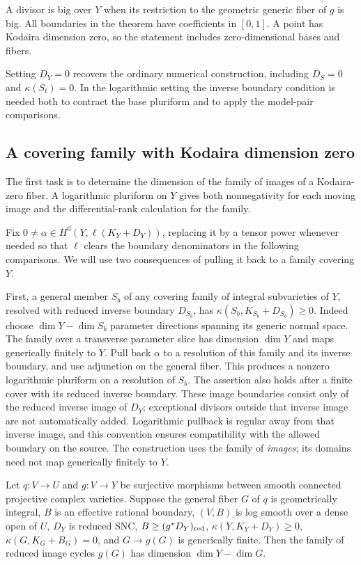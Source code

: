A divisor is big over $Y$ when its restriction to the geometric
generic fiber of $g$ is big. All boundaries in the theorem have
coefficients in $[0,1]$. A point has Kodaira dimension zero, so the
statement includes zero-dimensional bases and fibers.

Setting $D_Y=0$ recovers the ordinary numerical construction, including
$D_S=0$ and $\kappa(S_t)=0$. In the logarithmic setting the inverse
boundary condition is needed both to contract the base pluriform and
to apply the model-pair comparisons.

\subsection{A covering family with Kodaira dimension zero}

The first task is to determine the dimension of the family of images
of a Kodaira-zero fiber. A logarithmic pluriform on $Y$ gives both
nonnegativity for each moving image and the differential-rank
calculation for the family.

Fix $0\ne\alpha\in H^0(Y,\ell(K_Y+D_Y))$, replacing it by a tensor
power whenever needed so that $\ell$ clears the boundary denominators
in the following comparisons. We will use two consequences of
pulling it back to a family covering $Y$.

First, a general member $S_b$ of any covering family of integral
subvarieties of $Y$, resolved with reduced inverse boundary $D_{S_b}$,
has $\kappa(S_b,K_{S_b}+D_{S_b})\geq0$.
Indeed choose $\dim Y-\dim S_b$ parameter directions spanning its
generic normal space.  The family over a transverse parameter slice
has dimension $\dim Y$ and maps generically finitely to $Y$.
Pull back $\alpha$ to a resolution of this family and its inverse
boundary, and use adjunction on the general fiber. This produces a
nonzero logarithmic pluriform on a resolution of $S_b$. The assertion
also holds after a finite cover with its reduced inverse boundary.
These image boundaries consist only of the reduced inverse image
of $D_Y$; exceptional divisors outside that inverse image are not
automatically added. Logarithmic pullback is regular away from that
inverse image, and this convention ensures compatibility with the
allowed boundary on the source. The construction uses the family of
\emph{images}; its domains need not map generically finitely to $Y$.

\begin{lemma}\label{num:cycle-rank}
Let $q:V\to U$ and $g:V\to Y$ be surjective morphisms between
smooth connected projective complex varieties.  Suppose the general
fiber $G$ of $q$ is geometrically integral, $B$ is an effective
rational boundary, $(V,B)$ is log smooth over a
dense open of $U$, $D_Y$ is reduced SNC,
$B\geq(g^*D_Y)_{\mathrm{red}}$, $\kappa(Y,K_Y+D_Y)\geq0$,
$\kappa(G,K_G+B_G)=0$, and
$G\to g(G)$ is generically finite.  Then the family of reduced
image cycles $g(G)$ has dimension $\dim Y-\dim G$.
\end{lemma}

